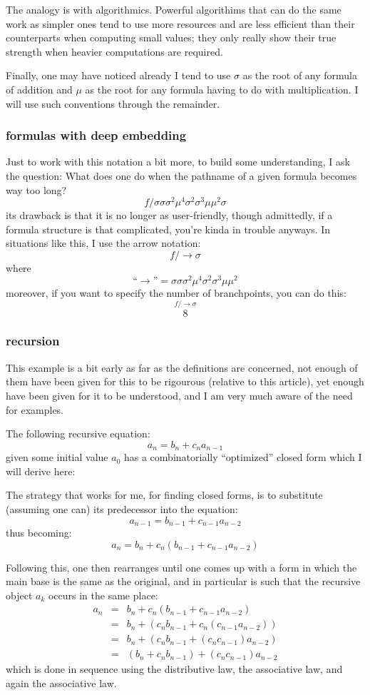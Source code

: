 \documentclass[twoside]{article}
\begin{document}
The analogy is with algorithmics.  Powerful algorithims that can do the same work as simpler ones tend to use more
resources and are less efficient than their counterparts when computing small values; they only really show their true
strength when heavier computations are required.

Finally, one may have noticed already I tend to use $ \sigma $ as the root of any formula of addition and $ \mu $ as the
root for any formula having to do with multiplication.  I will use such conventions through the remainder.

\subsubsection{formulas with deep embedding}

Just to work with this notation a bit more, to build some understanding, I ask the question:
What does one do when the pathname of a given formula becomes way too long?
$$ f/\sigma\sigma\sigma^2\mu^4\sigma^2\sigma^3\mu\mu^2\sigma $$
its drawback is that it is no longer as user-friendly, though admittedly, if a formula structure is that complicated,
you're kinda in trouble anyways.  In situations like this, I use the arrow notation:
$$ f/\!\!\rightarrow\sigma $$
where
$$ \mbox{``}\rightarrow\mbox{''}=\sigma\sigma\sigma^2\mu^4\sigma^2\sigma^3\mu\mu^2 $$
moreover, if you want to specify the number of branchpoints, you can do this:
$$ \stackrel{\textstyle f/\!\!\textstyle\rightarrow\sigma}{\scriptstyle 8} $$

\subsubsection{recursion}

This example is a bit early as far as the definitions are concerned, not enough of them have been given for this to
be rigourous (relative to this article), yet enough have been given for it to be understood, and I am very much aware
of the need for examples.

The following recursive equation:
$$ a_n=b_n+c_na_{n-1} $$
given some initial value $ a_0 $ has a combinatorially ``optimized'' closed form which I will derive here:

The strategy that works for me, for finding closed forms, is to
substitute (assuming one can) its predecessor into the equation:
$$ a_{n-1}=b_{n-1}+c_{n-1}a_{n-2} $$
thus becoming:
$$ a_n=b_n+c_n(b_{n-1}+c_{n-1}a_{n-2}) $$

Following this, one then rearranges until one comes up with a form in which the main base is the same as the original,
and in particular is such that the recursive object $ a_k $ occurs in the same place:
\begin{eqnarray*}
a_n & = & b_n+c_n(b_{n-1}+c_{n-1}a_{n-2}) \\
 & = & b_n+(c_nb_{n-1}+c_n(c_{n-1}a_{n-2})) \\
 & = & b_n+(c_nb_{n-1}+(c_nc_{n-1})a_{n-2}) \\
 & = & (b_n+c_nb_{n-1})+(c_nc_{n-1})a_{n-2}
\end{eqnarray*}
which is done in sequence using the distributive law, the associative law, and again the associative law.
\end{document}
